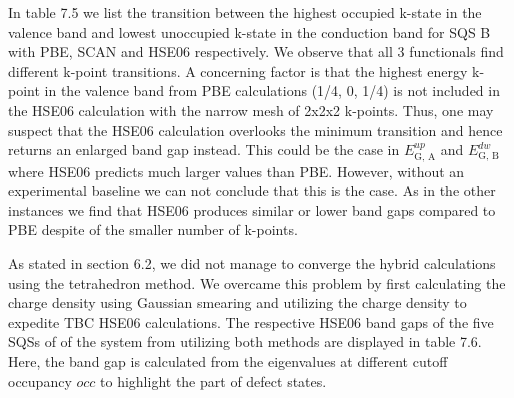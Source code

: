 In table 7.5 we list the transition between the highest occupied k-state in the valence band and lowest unoccupied k-state in the conduction band for SQS B with PBE, SCAN and HSE06 respectively. We  
observe that all 3 functionals find different k-point transitions. A concerning factor is that the highest energy k-point in the valence band from PBE calculations (1/4, 0, 1/4) is not included in the HSE06 calculation with the narrow mesh of 2x2x2 k-points. Thus, one may suspect that the HSE06 calculation overlooks the minimum transition and hence returns an enlarged band gap instead. This could be the case in $E_\text{G, A} ^{up}$ and $E_\text{G, B} ^{dw}$ where HSE06 predicts much larger values than PBE. However, without an experimental baseline we can not conclude that this is the case. As in the other instances we find that HSE06 produces similar or lower band gaps compared to PBE despite of the smaller number of k-points.     

As stated in section 6.2, we did not manage to converge the hybrid calculations using the tetrahedron method. We overcame this problem by first calculating the charge density using Gaussian smearing and utilizing the charge density to expedite TBC HSE06 calculations. The respective HSE06 band gaps of the five SQSs of of the  system from utilizing both methods are displayed in table 7.6. Here, the band gap is calculated from the eigenvalues at different cutoff occupancy $occ$ to highlight the part of defect states.

